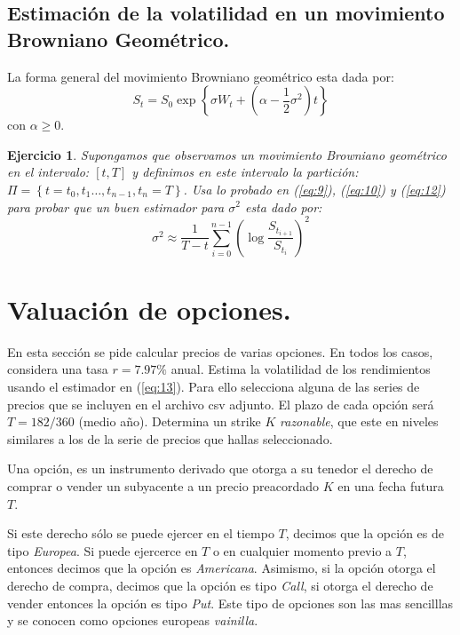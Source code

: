 \documentclass{article}
\newtheorem{ejercicio}{Ejercicio}
\begin{document}
\subsection{Estimación de la volatilidad en un movimiento Browniano Geométrico.}
La forma general del movimiento Browniano geométrico esta dada por:
\begin{equation}
    S_t = S_0 \exp\left\{\sigma W_t + (\alpha-\frac{1}{2}\sigma^2)t \right\}
\end{equation}
con $\alpha \geq 0$.
\begin{ejercicio}
    Supongamos que observamos un movimiento Browniano geométrico en el intervalo: $[t, T]$ y definimos en este intervalo la partición: $\Pi = \left\{t=t_0, t_1\ldots,t_{n-1}, t_n=T \right\}$. Usa lo probado en (\ref{eq:9}), (\ref{eq:10})  y (\ref{eq:12}) para probar que un buen estimador para $\sigma^2$ esta dado por:
\begin{equation}\label{eq:13}
    \sigma^2 \approx \frac{1}{T-t}\sum_{i=0}^{n-1}\left(\log\frac{S_{t_{i+1}}}{S_{t_i}}\right)^2
\end{equation}
\end{ejercicio}
\section{Valuación de opciones.}

En esta sección se pide calcular precios de varias opciones. En todos los casos, considera una tasa $r = 7.97\%$ anual. Estima la volatilidad de los rendimientos usando el estimador en (\ref{eq:13}). Para ello selecciona alguna de las series de precios que se incluyen en el archivo csv adjunto. El plazo de cada opción será $T = 182/360$ (medio año). Determina un strike $K$ \emph{razonable}, que este en niveles similares a los de la serie de precios que hallas seleccionado. 

Una opción, es un instrumento derivado  que otorga a su tenedor el derecho de comprar o vender un subyacente a un precio preacordado $K$ en una fecha futura $T$.

Si este derecho sólo se puede ejercer en el tiempo $T$, decimos que la opción es de tipo \emph{Europea}. Si puede ejercerce en $T$ o en cualquier momento previo a $T$, entonces decimos que la opción es \emph{Americana}. Asimismo, si la opción otorga el derecho de compra, decimos que la opción es tipo \emph{Call}, si otorga el derecho de vender entonces la opción es tipo \emph{Put}. Este tipo de opciones son las mas sencilllas y se conocen como opciones europeas \emph{vainilla}.
\end{document}
